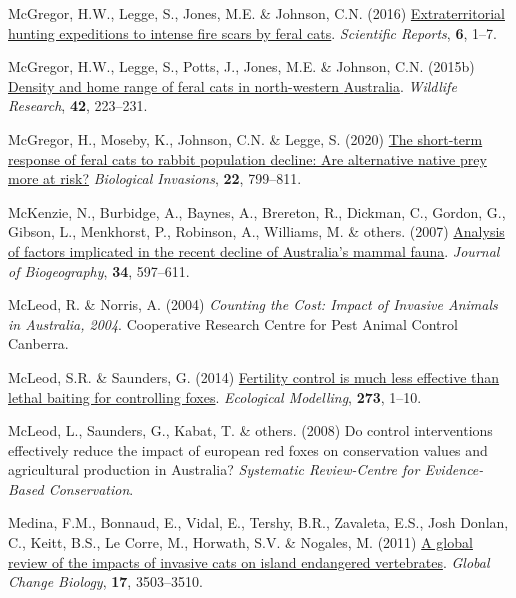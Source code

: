 \documentclass[11pt,a4paper,titlepage,twoside,openright]{style/unimelbthesis}
\newenvironment{CSLReferences}%
  {}%
  {\par}
\begin{document}
\begin{mainmatter}
\begin{CSLReferences}{1}{0}
\leavevmode{}%
McGregor, H.W., Legge, S., Jones, M.E. \& Johnson, C.N. (2016) \href{https://doi.org/10.1038/srep22559}{Extraterritorial hunting expeditions to intense fire scars by feral cats}. \emph{Scientific Reports}, \textbf{6}, 1--7.

\leavevmode{}%
McGregor, H.W., Legge, S., Potts, J., Jones, M.E. \& Johnson, C.N. (2015b) \href{https://doi.org/10.1071/WR14180}{Density and home range of feral cats in north-western {{A}ustralia}}. \emph{Wildlife Research}, \textbf{42}, 223--231.

\leavevmode{}%
McGregor, H., Moseby, K., Johnson, C.N. \& Legge, S. (2020) \href{https://doi.org/10.1007/s10530-019-02131-5}{The short-term response of feral cats to rabbit population decline: Are alternative native prey more at risk?} \emph{Biological Invasions}, \textbf{22}, 799--811.

\leavevmode{}%
McKenzie, N., Burbidge, A., Baynes, A., Brereton, R., Dickman, C., Gordon, G., Gibson, L., Menkhorst, P., Robinson, A., Williams, M. \& others. (2007) \href{https://doi.org/10.1111/j.1365-2699.2006.01639.x}{Analysis of factors implicated in the recent decline of {A}ustralia's mammal fauna}. \emph{Journal of Biogeography}, \textbf{34}, 597--611.

\leavevmode{}%
McLeod, R. \& Norris, A. (2004) \emph{Counting the Cost: Impact of Invasive Animals in {A}ustralia, 2004}. Cooperative Research Centre for Pest Animal Control Canberra.

\leavevmode{}%
McLeod, S.R. \& Saunders, G. (2014) \href{https://doi.org/10.1016/j.ecolmodel.2013.10.016}{Fertility control is much less effective than lethal baiting for controlling foxes}. \emph{Ecological Modelling}, \textbf{273}, 1--10.

\leavevmode{}%
McLeod, L., Saunders, G., Kabat, T. \& others. (2008) Do control interventions effectively reduce the impact of european red foxes on conservation values and agricultural production in {A}ustralia? \emph{Systematic Review-Centre for Evidence-Based Conservation}.

\leavevmode{}%
Medina, F.M., Bonnaud, E., Vidal, E., Tershy, B.R., Zavaleta, E.S., Josh Donlan, C., Keitt, B.S., Le Corre, M., Horwath, S.V. \& Nogales, M. (2011) \href{https://doi.org/10.1111/j.1365-2486.2011.02464.x}{A global review of the impacts of invasive cats on island endangered vertebrates}. \emph{Global Change Biology}, \textbf{17}, 3503--3510.


\end{CSLReferences}
\end{mainmatter}
\end{document}
